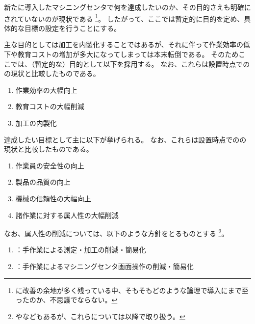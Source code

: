 

新たに導入したマシニングセンタで何を達成したいのか、その目的さえも明確にされていないのが現状である
\footnote{\MMC に改善の余地が多く残っている中、そもそもどのような論理で導入にまで至ったのか、不思議でならない。}。
したがって、ここでは暫定的に目的を定め、具体的な目標の設定を行うことにする。



主な目的としては\Dimple 加工を内製化することではあるが、それに伴って作業効率の低下や教育コストの増加が多大になってしまっては本末転倒である。
そのためここでは、（暫定的な）目的として以下を採用する。
なお、これらは\DMC 設置時点での\MMC の現状と比較したものである。
\begin{enumerate}[label=\sarrow]
\item 作業効率の大幅向上
\item 教育コストの大幅削減
\item \Dimple 加工の内製化
\end{enumerate}



達成したい目標として主に以下が挙げられる。
なお、これらは\DMC 設置時点での\MMC の現状と比較したものである。
\begin{enumerate}[label=\sarrow]
\item 作業員の安全性の向上
\item 製品の品質の向上
\item 機械の信頼性の大幅向上
\item 諸作業に対する属人性の大幅削減
\end{enumerate}
なお、属人性の削減については、以下のような方針をとるものとする
\footnote{やなどもあるが、これらについては以降で取り扱う。}。
\begin{enumerate}[label=\sarrow]
\item {}：手作業による測定・加工の削減・簡易化
\item {}：手作業によるマシニングセンタ画面操作の削減・簡易化
\end{enumerate}


